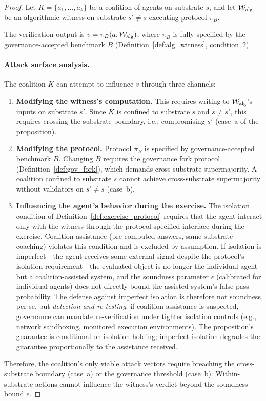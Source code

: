 \begin{proof}
Let $K = \{a_1, \ldots, a_k\}$ be a coalition of agents on substrate
$s$, and let $\mathcal{W}_{\mathrm{alg}}$ be an algorithmic witness on
substrate $s' \neq s$ executing protocol $\pi_B$.

The verification output is $v = \pi_B(a, \mathcal{W}_{\mathrm{alg}})$,
where $\pi_B$ is fully specified by the governance-accepted benchmark
$B$ (Definition~\ref{def:alg_witness}, condition~2).

\paragraph{Attack surface analysis.}
The coalition $K$ can attempt to influence $v$ through three channels:
\begin{enumerate}
    \item \textbf{Modifying the witness's computation.}  This requires
    writing to $\mathcal{W}_{\mathrm{alg}}$'s inputs on substrate $s'$.
    Since $K$ is confined to substrate $s$ and $s \neq s'$, this
    requires crossing the substrate boundary, i.e., compromising $s'$
    (case~a of the proposition).
    \item \textbf{Modifying the protocol.}  Protocol $\pi_B$ is
    specified by governance-accepted benchmark $B$.  Changing $B$
    requires the governance fork protocol
    (Definition~\ref{def:gov_fork}), which demands cross-substrate
    supermajority.  A coalition confined to substrate $s$ cannot achieve
    cross-substrate supermajority without validators on $s' \neq s$
    (case~b).
    \item \textbf{Influencing the agent's behavior during the exercise.}
    The isolation condition of Definition~\ref{def:exercise_protocol}
    requires that the agent interact only with the witness through the
    protocol-specified interface during the exercise.  Coalition
    assistance (pre-computed answers, same-substrate coaching) violates
    this condition and is excluded by assumption.  If isolation is
    imperfect---the agent receives some external signal despite the
    protocol's isolation requirement---the evaluated object is no
    longer the individual agent but a coalition-assisted system, and
    the soundness parameter $\epsilon$ (calibrated for individual
    agents) does not directly bound the assisted system's false-pass
    probability.  The defense against imperfect isolation is therefore
    not soundness per se, but \emph{detection and re-testing}: if
    coalition assistance is suspected, governance can mandate
    re-verification under tighter isolation controls (e.g., network
    sandboxing, monitored execution environments).  The proposition's
    guarantee is conditional on isolation holding; imperfect isolation
    degrades the guarantee proportionally to the assistance received.
\end{enumerate}

Therefore, the coalition's only viable attack vectors require breaching
the cross-substrate boundary (case~a) or the governance threshold
(case~b).  Within-substrate actions cannot influence the witness's
verdict beyond the soundness bound $\epsilon$.
\end{proof}

